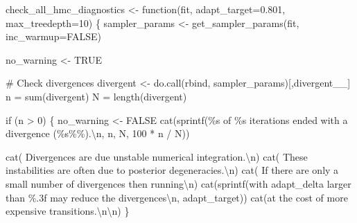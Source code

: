 \documentclass[
  letterpaper,
  DIV=11,
  numbers=noendperiod]{scrartcl}
\newenvironment{Shaded}{\begin{snugshade}}{\end{snugshade}}
\newcommand{\AttributeTok}[1]{\textcolor[rgb]{0.40,0.45,0.13}{#1}}
\newcommand{\CommentTok}[1]{\textcolor[rgb]{0.37,0.37,0.37}{#1}}
\newcommand{\ConstantTok}[1]{\textcolor[rgb]{0.56,0.35,0.01}{#1}}
\newcommand{\ControlFlowTok}[1]{\textcolor[rgb]{0.00,0.23,0.31}{#1}}
\newcommand{\DecValTok}[1]{\textcolor[rgb]{0.68,0.00,0.00}{#1}}
\newcommand{\FloatTok}[1]{\textcolor[rgb]{0.68,0.00,0.00}{#1}}
\newcommand{\FunctionTok}[1]{\textcolor[rgb]{0.28,0.35,0.67}{#1}}
\newcommand{\NormalTok}[1]{\textcolor[rgb]{0.00,0.23,0.31}{#1}}
\newcommand{\OtherTok}[1]{\textcolor[rgb]{0.00,0.23,0.31}{#1}}
\newcommand{\SpecialCharTok}[1]{\textcolor[rgb]{0.37,0.37,0.37}{#1}}
\newcommand{\StringTok}[1]{\textcolor[rgb]{0.13,0.47,0.30}{#1}}
\begin{document}
\begin{Shaded}
\begin{Highlighting}[]
\NormalTok{check\_all\_hmc\_diagnostics }\OtherTok{\textless{}{-}} \ControlFlowTok{function}\NormalTok{(fit,}
                                      \AttributeTok{adapt\_target=}\FloatTok{0.801}\NormalTok{,}
                                      \AttributeTok{max\_treedepth=}\DecValTok{10}\NormalTok{) \{}
\NormalTok{  sampler\_params }\OtherTok{\textless{}{-}} \FunctionTok{get\_sampler\_params}\NormalTok{(fit, }\AttributeTok{inc\_warmup=}\ConstantTok{FALSE}\NormalTok{)}

\NormalTok{  no\_warning }\OtherTok{\textless{}{-}} \ConstantTok{TRUE}

  \CommentTok{\# Check divergences}
\NormalTok{  divergent }\OtherTok{\textless{}{-}} \FunctionTok{do.call}\NormalTok{(rbind, sampler\_params)[,}\StringTok{\textquotesingle{}divergent\_\_\textquotesingle{}}\NormalTok{]}
\NormalTok{  n }\OtherTok{=} \FunctionTok{sum}\NormalTok{(divergent)}
\NormalTok{  N }\OtherTok{=} \FunctionTok{length}\NormalTok{(divergent)}

  \ControlFlowTok{if}\NormalTok{ (n }\SpecialCharTok{\textgreater{}} \DecValTok{0}\NormalTok{) \{}
\NormalTok{    no\_warning }\OtherTok{\textless{}{-}} \ConstantTok{FALSE}
    \FunctionTok{cat}\NormalTok{(}\FunctionTok{sprintf}\NormalTok{(}\StringTok{\textquotesingle{}\%s of \%s iterations ended with a divergence (\%s\%\%).}\SpecialCharTok{\textbackslash{}n}\StringTok{\textquotesingle{}}\NormalTok{,}
\NormalTok{                n, N, }\DecValTok{100} \SpecialCharTok{*}\NormalTok{ n }\SpecialCharTok{/}\NormalTok{ N))}

    \FunctionTok{cat}\NormalTok{(}\StringTok{\textquotesingle{}  Divergences are due unstable numerical integration.}\SpecialCharTok{\textbackslash{}n}\StringTok{\textquotesingle{}}\NormalTok{)}
    \FunctionTok{cat}\NormalTok{(}\StringTok{\textquotesingle{}  These instabilities are often due to posterior degeneracies.}\SpecialCharTok{\textbackslash{}n}\StringTok{\textquotesingle{}}\NormalTok{)}
    \FunctionTok{cat}\NormalTok{(}\StringTok{\textquotesingle{}  If there are only a small number of divergences then running}\SpecialCharTok{\textbackslash{}n}\StringTok{\textquotesingle{}}\NormalTok{)}
    \FunctionTok{cat}\NormalTok{(}\FunctionTok{sprintf}\NormalTok{(}\StringTok{\textquotesingle{}with adapt\_delta larger than \%.3f may reduce the divergences}\SpecialCharTok{\textbackslash{}n}\StringTok{\textquotesingle{}}\NormalTok{,}
\NormalTok{                adapt\_target))}
    \FunctionTok{cat}\NormalTok{(}\StringTok{\textquotesingle{}at the cost of more expensive transitions.}\SpecialCharTok{\textbackslash{}n\textbackslash{}n}\StringTok{\textquotesingle{}}\NormalTok{)}
\NormalTok{  \}}


\end{Highlighting}
\end{Shaded}
\end{document}

